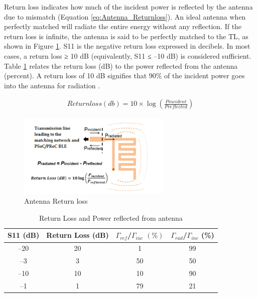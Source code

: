 \indent  Return loss indicates how much of the incident power is reflected by the antenna due to mismatch (Equation \ref{eq:Antenna_Returnloss}).
An ideal antenna when perfectly matched will radiate the entire energy without any reflection. If the return loss is infinite, the antenna is said to be perfectly matched to the TL, as shown in Figure \ref{fig:ANTENNA_RETUNRNLOSS}. S11 is the negative return loss expressed in decibels. In most cases, a return loss ≥ 10 dB (equivalently, S11 ≤ –10 dB) is considered sufficient. Table \ref{tb:ANTENNA_RETURNlOSS_TABLE} relates the return loss (dB) to the power reflected from the antenna (percent). 
A return loss of 10 dB signifies that $90\%$ of the incident power goes into the antenna for radiation \cite{AN91445}.

\begin{equation}\label{eq:Antenna_Returnloss}
    \begin{split}
        Returnloss(db) = 10 \times \log( \frac{Pincident}{Preflected})
    \end{split}
\end{equation}

\begin{figure}[h]
	\centering
	\includegraphics[width=0.65\textwidth]{Chap03/Figures/Antenna_ReturnLoss.PNG}
	\caption{Antenna Return loss}
	\label{fig:ANTENNA_RETUNRNLOSS}
\end{figure}

\begin{table}[h]
	\begin{tabular}{|c|c|c|c| }
		\hline 
		S11 (dB) & Return Loss (dB) & $\varGamma_{ref}$/$\varGamma_{inc}$ $(\%)$ & $\varGamma_{rad}$/$\varGamma_{inc}$ (\%) \\ 
		\hline
		–20 &20 &1 &99\\
		\hline
		–3 &3 &50 &50\\
		\hline
		–10 &10 &10& 90\\
		\hline
		–1 &1 &79 &21\\
		\hline
	\end{tabular}
	\caption{Return Loss and Power reflected from antenna}
	\label{tb:ANTENNA_RETURNlOSS_TABLE}
\end{table}



